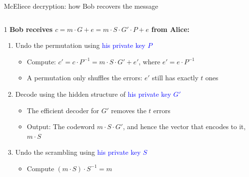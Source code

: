 \ifdefined\PRESENTATION\else\PassOptionsToClass{handout}{beamer}\fi\documentclass[aspectratio=169, lualatex]{beamer}
\begin{document}
\begin{frame}{McEliece decryption: how Bob recovers the message}
	\begin{columns}[c]
		\begin{column}{1\textwidth}
			\textbf{Bob receives $c = m \cdot G + e = m \cdot S \cdot G' \cdot P + e$ from Alice:}
			\begin{enumerate}
				\item Undo the permutation using \textcolor{blue}{his private key $P$}
				      \begin{itemize}
					      \item Compute: $c' = c \cdot P^{-1} = m \cdot S \cdot G' + e'$, where $e' = e \cdot P^{-1}$
					      \item A permutation only shuffles the errors: $e'$ still has exactly $t$ ones
				      \end{itemize}
				\item Decode using the hidden structure of \textcolor{blue}{his private key $G'$}
				      \begin{itemize}
					      \item The efficient decoder for $G'$ removes the $t$ errors
					      \item Output: The codeword $m \cdot S \cdot G'$, and hence the vector that encodes to it, $m \cdot S$
				      \end{itemize}
				\item Undo the scrambling using \textcolor{blue}{his private key $S$}
				      \begin{itemize}
					      \item Compute $(m \cdot S) \cdot S^{-1} = m$
				      \end{itemize}
			\end{enumerate}
		\end{column}
	\end{columns}
\end{frame}
\end{document}
